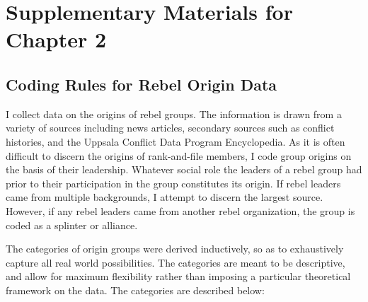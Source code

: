 \documentclass[12pt,]{book}
\theoremstyle{definition}
\theoremstyle{definition}
\theoremstyle{definition}
\theoremstyle{remark}
\begin{document}
\setcounter{table}{0}\setcounter{section}{0}

\hypertarget{supplementary-materials-for-chapter-2}{%
\section*{Supplementary Materials for Chapter
2}\label{supplementary-materials-for-chapter-2}}

\hypertarget{coding-rules-for-rebel-origin-data}{%
\subsection*{Coding Rules for Rebel Origin
Data}\label{coding-rules-for-rebel-origin-data}}

I collect data on the origins of rebel groups. The information is drawn
from a variety of sources including news articles, secondary sources
such as conflict histories, and the Uppsala Conflict Data Program
Encyclopedia. As it is often difficult to discern the origins of
rank-and-file members, I code group origins on the basis of their
leadership. Whatever social role the leaders of a rebel group had prior
to their participation in the group constitutes its origin. If rebel
leaders came from multiple backgrounds, I attempt to discern the largest
source. However, if any rebel leaders came from another rebel
organization, the group is coded as a splinter or alliance.

The categories of origin groups were derived inductively, so as to
exhaustively capture all real world possibilities. The categories are
meant to be descriptive, and allow for maximum flexibility rather than
imposing a particular theoretical framework on the data. The categories
are described below:
\end{document}
